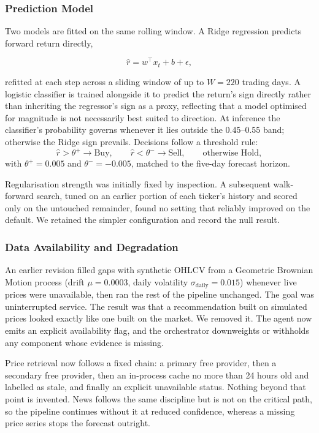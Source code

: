 \documentclass[conference]{IEEEtran}
\begin{document}
\subsubsection{Prediction Model}

Two models are fitted on the same rolling window. A Ridge regression predicts forward return directly,

\begin{equation}
\hat{r} = w^\top x_t + b + \epsilon,
\end{equation}

refitted at each step across a sliding window of up to $W = 220$ trading days. A logistic classifier is trained alongside it to predict the return's sign directly rather than inheriting the regressor's sign as a proxy, reflecting that a model optimised for magnitude is not necessarily best suited to direction. At inference the classifier's probability governs whenever it lies outside the 0.45--0.55 band; otherwise the Ridge sign prevails. Decisions follow a threshold rule:
\[
\hat{r} > \theta^{+} \rightarrow \text{Buy}, \qquad
\hat{r} < \theta^{-} \rightarrow \text{Sell}, \qquad
\text{otherwise Hold},
\]
with $\theta^{+} = 0.005$ and $\theta^{-} = -0.005$, matched to the five-day forecast horizon.

Regularisation strength was initially fixed by inspection. A subsequent walk-forward search, tuned on an earlier portion of each ticker's history and scored only on the untouched remainder, found no setting that reliably improved on the default. We retained the simpler configuration and record the null result.

\subsubsection{Data Availability and Degradation}

An earlier revision filled gaps with synthetic OHLCV from a Geometric Brownian Motion process (drift $\mu = 0.0003$, daily volatility $\sigma_{\mathrm{daily}} = 0.015$) whenever live prices were unavailable, then ran the rest of the pipeline unchanged. The goal was uninterrupted service. The result was that a recommendation built on simulated prices looked exactly like one built on the market. We removed it. The agent now emits an explicit availability flag, and the orchestrator downweights or withholds any component whose evidence is missing.

Price retrieval now follows a fixed chain: a primary free provider, then a secondary free provider, then an in-process cache no more than 24 hours old and labelled as stale, and finally an explicit unavailable status. Nothing beyond that point is invented. News follows the same discipline but is not on the critical path, so the pipeline continues without it at reduced confidence, whereas a missing price series stops the forecast outright.
\end{document}
